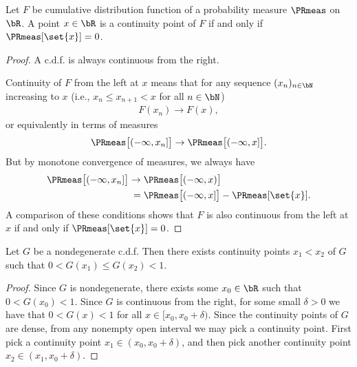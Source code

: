 \begin{lemma}
  \label{lem:cdf-continuity-pt-iff-measure-singleton}
  \leanok
  Let $F$ be cumulative distribution function of a
  probability measure $\PRmeas$ on $\bR$. A point $x \in \bR$ is
  a continuity point of $F$ if and only if $\PRmeas[\set{x}] = 0$.
\end{lemma}
\begin{proof}
  A c.d.f. is always continuous from the right.

  Continuity of $F$ from the left at $x$ means that for any
  sequence $(x_n)_{n \in \bN}$ increasing to $x$
  (i.e., $x_n \le x_{n+1} < x$ for all $n \in \bN$)
  \begin{align*}
    F(x_n) \to F(x) ,
  \end{align*}
  or equivalently in terms of measures
  \begin{align*}
    \PRmeas \big[ (-\infty,x_n] \big] \to \PRmeas \big[ (-\infty,x] \big] .
  \end{align*}
  But by monotone convergence of measures, we always have
  \begin{align*}
    \PRmeas \big[ (-\infty,x_n] \big]
    \to \; & \PRmeas \big[ (-\infty,x) \big] \\
    = \; & \PRmeas \big[ (-\infty,x] \big] - \PRmeas[\set{x}] .
  \end{align*}
  A comparison of these conditions shows that $F$ is also continuous from the left
  at $x$ if and only if $\PRmeas[\set{x}] = 0$.
\end{proof}

\begin{lemma}
  \label{lem:exists-two-nontrivial-continuity-pts-cdf}
  \leanok
  Let $G$ be a nondegenerate c.d.f. Then there exists
  continuity points $x_1 < x_2$ of $G$ such that
  $0 < G(x_1) \le G(x_2) < 1$.
\end{lemma}
\begin{proof}
  Since $G$ is nondegenerate, there exists some $x_0 \in \bR$ such that
  $0 < G(x_0) < 1$. Since $G$ is continuous from the right, for some
  small $\delta > 0$ we have that $0 < G(x) < 1$ for
  all $x \in [x_0,x_0+\delta)$. Since the continuity points of $G$
  are dense, from any nonempty open interval we may pick a continuity point.
  First pick a continuity point $x_1 \in (x_0,x_0+\delta)$,
  and then pick another continuity point $x_2 \in (x_1,x_0+\delta)$.
\end{proof}
